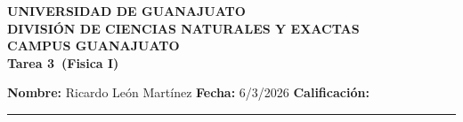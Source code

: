 \documentclass[12pt,a4paper]{article}
\newcommand{\alumno}{Ricardo León Martínez}
\newcommand{\materia}{Fisica I}
\newcommand{\tarea}{Tarea 3}
\newcommand{\fecha}{6/3/2026}
\begin{document}
    \begin{center}
    {\large\textbf{UNIVERSIDAD DE GUANAJUATO}}\\[0.3cm]
    {\normalsize\textbf{DIVISIÓN DE CIENCIAS NATURALES Y EXACTAS}}\\
    {\normalsize\textbf{CAMPUS GUANAJUATO}}\\[1cm]

    {\Large\textbf{\tarea\ (\materia)}}\\[1cm]
    \end{center}

    \textbf{Nombre:} \alumno \hfill 
    \textbf{Fecha:} \fecha \hfill 
    \textbf{Calificación:} \rule{3cm}{0.4pt} \\[0.3cm]
\end{document}
